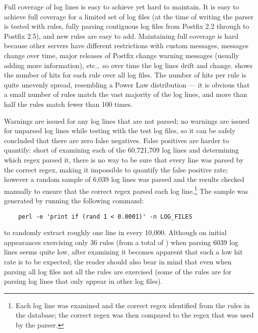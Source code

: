 Full coverage of log lines is easy to achieve yet hard to maintain.  It is
easy to achieve full coverage for a limited set of log files (at the time
of writing the parser is tested with \numberOFrules{} rules, fully parsing
\numberOFlogFILESall{} contiguous log files from Postfix 2.2 through to
Postfix 2.5), and new rules are easy to add.  Maintaining full coverage is
hard because other servers have different restrictions with custom
messages,  messages change over time, major releases of
Postfix change warning messages (usually adding more information), etc.,\
so over time the log lines drift and change.  
shows the number of hits for each rule over all \numberOFlogFILES{} log
files.  The number of hits per rule is quite unevenly spread, resembling a
Power Law distribution --- it is obvious that a small number of rules match
the vast majority of the log lines, and more than half the rules match
fewer than 100 times.


Warnings are issued for any log lines that are not parsed; no warnings are
issued for unparsed log lines while testing with the \numberOFlogFILES{}
test log files, so it can be safely concluded that there are zero false
negatives.  False positives are harder to quantify: short of examining each
of the 60,721,709 log lines and determining which regex parsed it, there
is no way to be sure that every line was parsed by the correct regex,
making it impossible to quantify the false positive rate; however a random
sample of 6,039 log lines was parsed and the results checked manually to
ensure that the correct regex parsed each log line.\footnote{Each log
line was examined and the correct regex identified from the
\numberOFrules{} rules in the database; the correct regex was then
compared to the regex that was used by the parser.}  The sample was
generated by running the following command:

\verb!    perl -e 'print if (rand 1 < 0.0001)' -n LOG_FILES!

\noindent{}to randomly extract roughly one line in every 10,000.  Although
on initial appearances exercising only 36 rules (from a total of
\numberOFrules{}) when parsing 6039 log lines seems quite low, after
examining \graphref{rule hits graph} it becomes apparent that such
a low hit rate is to be expected; the reader should also bear in mind that
even when parsing all \numberOFlogFILES{} log files not all the rules are
exercised (some of the rules are for parsing log lines that only appear in
other log files).

